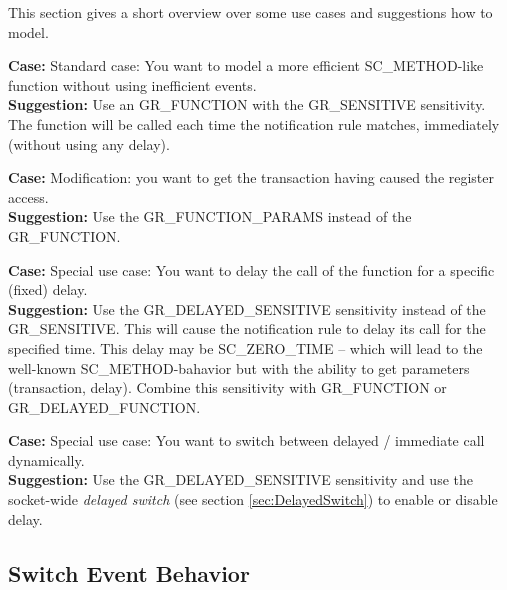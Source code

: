 This section gives a short overview over some use cases and suggestions how to model.

\noindent
\begin{minipage}{\textwidth}
{\bf Case:} Standard case: You want to model a more efficient {\sffamily SC\_METHOD}-like function without using inefficient events.\\
{\bf Suggestion:} Use an {\sffamily GR\_FUNCTION} with the {\sffamily GR\_SENSITIVE} sensitivity. The function will be called each time the notification rule matches, immediately (without using any delay).
\end{minipage}

\noindent
\begin{minipage}{\textwidth}
{\bf Case:} Modification: you want to get the transaction having caused the register access.\\
{\bf Suggestion:} Use the {\sffamily GR\_FUNCTION\_PARAMS} instead of the {\sffamily GR\_FUNCTION}.
\end{minipage}

\noindent
\begin{minipage}{\textwidth}
{\bf Case:} Special use case: You want to delay the call of the function for a specific (fixed) delay.\\
{\bf Suggestion:} Use the {\sffamily GR\_DELAYED\_SENSITIVE} sensitivity instead of the {\sffamily GR\_SENSITIVE}. This will cause the notification rule to delay its call for the specified time. This delay may be {\sffamily SC\_ZERO\_TIME} -- which will lead to the well-known {\sffamily SC\_METHOD}-bahavior but with the ability to get parameters (transaction, delay). Combine this sensitivity with {\sffamily GR\_FUNCTION} or {\sffamily GR\_DELAYED\_FUNCTION}.
\end{minipage}

\noindent
\begin{minipage}{\textwidth}
{\bf Case:} Special use case: You want to switch between delayed / immediate call dynamically.\\
{\bf Suggestion:} Use the {\sffamily GR\_DELAYED\_SENSITIVE} sensitivity and use the socket-wide {\em delayed switch} (see section \ref{sec:DelayedSwitch}) to enable or disable delay. 
\end{minipage}


\subsection{Switch Event Behavior}
\label{sec:EventSwitch}

